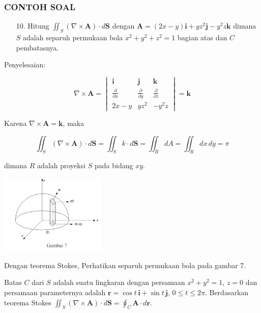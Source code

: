 \documentclass[10pt]{beamer}
\begin{document}
\begin{frame}
\frametitle{CONTOH SOAL}
\begin{enumerate}
\item [10.]Hitung $\iint_S (\nabla \times \mathbf{A}) \cdot d\mathbf{S}$ dengan $\mathbf{A} = (2x - y)\mathbf{i} + yz^2\mathbf{j} - y^2z\mathbf{k}$ dimana $S$ adalah separuh permukaan bola $x^2 + y^2 + z^2 = 1$ bagian atas dan $C$ pembatasnya.
\end{enumerate}  
\end{frame}
\begin{frame}
Penyelesaian:

\[
\nabla \times \mathbf{A} = \begin{vmatrix}
\mathbf{i} & \mathbf{j} & \mathbf{k} \\
\frac{\partial}{\partial x} & \frac{\partial}{\partial y} & \frac{\partial}{\partial z} \\
2x - y & yz^2 & -y^2z
\end{vmatrix} = \mathbf{k}
\]

Karena $\nabla \times \mathbf{A} = \mathbf{k}$, maka

\[
\iint_S (\nabla \times \mathbf{A}) \cdot d\mathbf{S} = \iint_S k \cdot d\mathbf{S} = \iint_R dA = \iint_R dx \, dy = \pi
\]

dimana $R$ adalah proyeksi $S$ pada bidang $xy$.
\end{frame}

\begin{frame}
    \begin{center}
        \includegraphics[width=2in]{GAMBAR 7.png}
    \end{center}
    Dengan teorema Stokes, Perhatikan separuh permukaan bola pada gambar 7.

Batas $C$ dari $S$ adalah suatu lingkaran dengan persamaan $x^2 + y^2 = 1$, $z = 0$ dan persamaan parameternya adalah $\mathbf{r} = \cos t \, \mathbf{i} + \sin t \, \mathbf{j}$, $0 \leq t \leq 2\pi$. Berdasarkan teorema Stokes $\iint_S (\nabla \times \mathbf{A}) \cdot d\mathbf{S} = \oint_C \mathbf{A} \cdot d\mathbf{r}$.
\end{frame}
\end{document}
